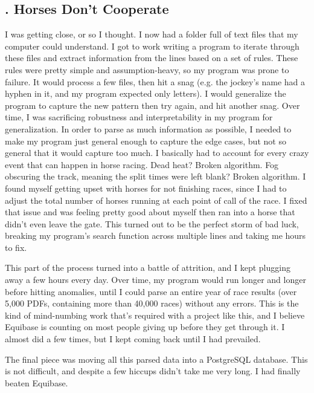 \documentclass{article}
\begin{document}
\subsection*{. Horses Don't Cooperate}

I was getting close, or so I thought. I now had a folder full of text files that my computer could understand. I got to work writing a program to iterate through these files and extract information from the lines based on a set of rules. These rules were pretty simple and assumption-heavy, so my program was prone to failure. It would process a few files, then hit a snag (e.g. the jockey's name had a hyphen in it, and my program expected only letters). I would generalize the program to capture the new pattern then try again, and hit another snag. Over time, I was sacrificing robustness and interpretability in my program for generalization. In order to parse as much information as possible, I needed to make my program just general enough to capture the edge cases, but not so general that it would capture too much. I basically had to account for every crazy event that can happen in horse racing. Dead heat? Broken algorithm. Fog obscuring the track, meaning the split times were left blank? Broken algorithm. I found myself getting upset with horses for not finishing races, since I had to adjust the total number of horses running at each point of call of the race. I fixed that issue and was feeling pretty good about myself then ran into a horse that didn't even leave the gate. This turned out to be the perfect storm of bad luck, breaking my program's search function across multiple lines and taking me hours to fix. 

This part of the process turned into a battle of attrition, and I kept plugging away a few hours every day. Over time, my program would run longer and longer before hitting anomalies, until I could parse an entire year of race results (over 5,000 PDFs, containing more than 40,000 races) without any errors. This is the kind of mind-numbing work that's required with a project like this, and I believe Equibase is counting on most people giving up before they get through it. I almost did a few times, but I kept coming back until I had prevailed.

\bigbreak

The final piece was moving all this parsed data into a PostgreSQL database. This is not difficult, and despite a few hiccups didn't take me very long. I had finally beaten Equibase.

\section*{}
\end{document}

